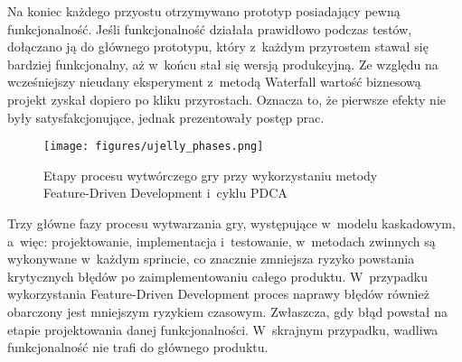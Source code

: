 Na koniec każdego przyostu otrzymywano prototyp posiadający pewną funkcjonalność. Jeśli funkcjonalność działała prawidłowo podczas testów, dołączano ją do głównego prototypu, który z~każdym przyrostem stawał się bardziej funkcjonalny, aż w~końcu stał się wersją produkcyjną. Ze względu na wcześniejszy nieudany eksperyment z~metodą Waterfall wartość biznesową projekt zyskał dopiero po kliku przyrostach. Oznacza to, że pierwsze efekty nie były satysfakcjonujące, jednak prezentowały postęp prac. 

\begin{figure}
\begin{center}
\texttt{[image: figures/ujelly\_phases.png]}
\caption{Etapy procesu wytwórczego gry przy wykorzystaniu metody Feature-Driven Development i~cyklu PDCA}
\label{ujelly_phases}
\end{center}
\end{figure}

Trzy główne fazy procesu wytwarzania gry, występujące w~modelu kaskadowym, a~więc: projektowanie, implementacja i~testowanie, w~metodach zwinnych są wykonywane w~każdym sprincie, co znacznie zmniejsza ryzyko powstania krytycznych błędów po zaimplementowaniu całego produktu. W~przypadku wykorzystania Feature-Driven Development proces naprawy błędów również obarczony jest mniejszym ryzykiem czasowym. Zwłaszcza, gdy błąd powstał na etapie projektowania danej funkcjonalności. W~skrajnym przypadku, wadliwa funkcjonalność nie trafi do głównego produktu.
